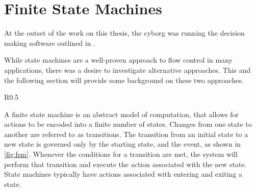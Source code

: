 \documentclass[\rootfolder/main.tex]{subfiles}
\begin{document}







\section{Finite State Machines}

At the outset of the work on this thesis, the cyborg was running the decision making software outlined in \cite{Andersen2017}.

While state machines are a well-proven approach to flow control in many applications, there was a desire to investigate alternative approaches.
This and the following section will provide some background on these two approaches.

\begin{wrapfigure}{R}{0.5\columnwidth}
    \caption{An example of a simple state machine.}
    \label{fig:fsm}
\end{wrapfigure}

A finite state machine is an abstract model of computation, that allows for actions to be encoded into a finite number of states.
Changes from one state to another are referred to as transitions.
The transition from an initial state to a new state is governed only by the starting state, and the event, as shown in \cref{fig:fsm}.
Whenever the conditions for a transition are met, the system will perform that transition and execute the action associated with the new state.
State machines typically have actions associated with entering and exiting a state.
\end{document}
